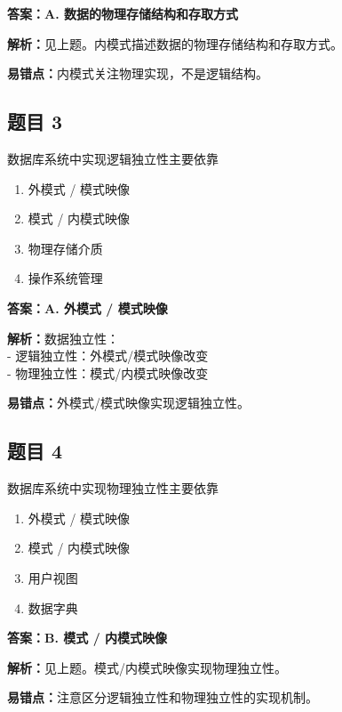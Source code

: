 \documentclass[12pt,a4paper]{ctexart}
\begin{document}
\begin{answerbox}
	\textbf{答案：A. 数据的物理存储结构和存取方式}

	\textbf{解析：}见上题。内模式描述数据的物理存储结构和存取方式。

	\textbf{易错点：}内模式关注物理实现，不是逻辑结构。
\end{answerbox}

\subsection*{题目 3}
数据库系统中实现逻辑独立性主要依靠
\begin{enumerate}[label=\Alph*.]
	\item 外模式 / 模式映像
	\item 模式 / 内模式映像
	\item 物理存储介质
	\item 操作系统管理
\end{enumerate}

\begin{answerbox}
	\textbf{答案：A. 外模式 / 模式映像}

	\textbf{解析：}数据独立性：\\
	- 逻辑独立性：外模式/模式映像改变\\
	- 物理独立性：模式/内模式映像改变

	\textbf{易错点：}外模式/模式映像实现逻辑独立性。
\end{answerbox}

\subsection*{题目 4}
数据库系统中实现物理独立性主要依靠
\begin{enumerate}[label=\Alph*.]
	\item 外模式 / 模式映像
	\item 模式 / 内模式映像
	\item 用户视图
	\item 数据字典
\end{enumerate}

\begin{answerbox}
	\textbf{答案：B. 模式 / 内模式映像}

	\textbf{解析：}见上题。模式/内模式映像实现物理独立性。

	\textbf{易错点：}注意区分逻辑独立性和物理独立性的实现机制。
\end{answerbox}

\newpage
\end{document}
